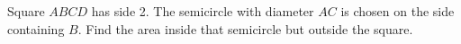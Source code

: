 Square $ABCD$ has side 2. The semicircle with diameter $AC$ is chosen on the side containing $B$. Find the area inside that semicircle but outside the square.
